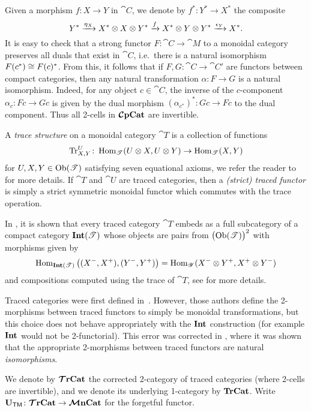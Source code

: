 \documentclass[11pt,oneside,article]{memoir}
\begin{document}
Given a morphism $f\colon X\to Y$ in $\cat{C}$, we denote by $f^*\colon Y^*\to X^*$ the composite
\begin{equation*}
   Y^*\xrightarrow{\eta_X}X^*\otimes X\otimes Y^* \xrightarrow{f}X^*\otimes Y\otimes Y^*\xrightarrow{\epsilon_Y}X^*.
\end{equation*}
It is easy to check that a strong functor $F\colon\cat{C}\to\cat{M}$ to a monoidal category preserves all duals that exist
in $\cat{C}$, i.e.\ there is a natural isomorphism $F(c^*)\cong F(c)^*$. From this, it follows that if $F,G\colon\cat{C}\to\cat{C'}$ are functors between compact categories, then any natural
transformation $\alpha\colon F\to G$ is a natural isomorphism. Indeed, for any object $c\in\cat{C}$,
the inverse of the $c$-component $\alpha_c\colon Fc\to Gc$ is given by the dual morphism
$(\alpha_{c^*})^*\colon Gc\to Fc$ to the dual component. Thus all 2-cells in $\bm{\mathcal{C}}\mathbf{pCat}$ are invertible.

A \emph{trace structure} on a monoidal category $\cat{T}$ is a collection of functions
\begin{equation}
      \label{dia:trace function}
   \operatorname{Tr}^U_{X,Y}\colon\operatorname{Hom}_{\mathscr{T}}(U\otimes X,U\otimes Y)\to\operatorname{Hom}_{\mathscr{T}}(X,Y)
\end{equation}
for $U,X,Y\in\mathrm{Ob}(\mathscr{T})$ satisfying seven equational axioms, we refer the reader to \cite{JoyalStreetVerity} for more details. If $\cat{T}$ and $\cat{U}$ are traced categories, then a \emph{(strict) traced functor} is simply a strict symmetric monoidal functor which commutes with the trace operation.

In \cite{JoyalStreetVerity}, it is shown that every traced category $\cat{T}$ embeds as a full subcategory of a compact category $\mathbf{Int}(\mathscr{T})$ whose objects are pairs from $\big(\mathrm{Ob}(\mathscr{T})\big)^2$ with morphisms given by
\begin{equation*}
   \operatorname{Hom}_{\mathbf{Int}(\mathscr{T})}\big((X^-,X^+),(Y^-,Y^+)\big)
      = \operatorname{Hom}_{\mathscr{Y}}(X^-\otimes Y^+,X^+\otimes Y^-)
\end{equation*}
and compositions computed using the trace of $\cat{T}$, see \cite{JoyalStreetVerity} for more details.
\begin{remark}
      \label{rem:traced_2morphisms}
   Traced categories were first defined in~\cite{JoyalStreetVerity}. However, those authors define
   the 2-morphisms between traced functors to simply be monoidal transformations, but this choice does
   not behave appropriately with the $\mathbf{Int}$ construction (for example $\mathbf{Int}$ would not be
   2-functorial). This error was corrected in \cite{HK}, where it was shown that the appropriate
   2-morphisms between traced functors are natural \emph{isomorphisms}. 
\end{remark}
We denote by $\bm{\mathcal{T}}\mathbf{rCat}$ the corrected 2-category of traced categories (where 2-cells are invertible), and we denote its underlying 1-category by $\mathbf{TrCat}$. Write $\mathbf{U}_{\mathsf{TM}}\colon\bm{\mathcal{T}}\mathbf{rCat}\to\bm{\mathcal{M}}\mathbf{nCat}$ for the forgetful functor.
\end{document}
